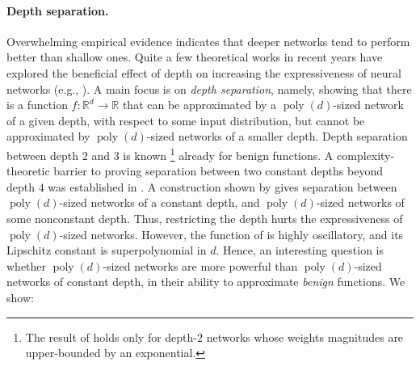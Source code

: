 \documentclass[11pt]{article}
\newcommand{\reals}{{\mathbb R}}
\DeclareMathOperator{\poly}{poly}
\begin{document}
\paragraph{Depth separation.}
Overwhelming empirical evidence indicates that deeper networks tend to perform better than shallow ones.
Quite a few theoretical works in recent years have explored the beneficial effect of depth on increasing the expressiveness of neural networks
(e.g., \cite{martens2013representational,eldan2016power,telgarsky2016benefits,liang2016deep,daniely2017depth,safran2017depth,yarotsky2017error,safran2019depth,vardi2020neural,bresler2020sharp}).
A main focus is on {\em depth separation}, namely, showing that there is a function $f:\reals^d \rightarrow \reals$ that can be approximated by a $\poly(d)$-sized network of a given depth, with respect to some input distribution, but cannot be approximated by $\poly(d)$-sized networks of a smaller depth.
%
Depth separation between depth $2$ and $3$ is known \citep{eldan2016power,daniely2017depth}\footnote{The result of \cite{daniely2017depth} holds only for depth-$2$ networks whose weights magnitudes are upper-bounded by an exponential.} already for benign functions.
A complexity-theoretic barrier to proving separation between two constant depths beyond depth $4$ was established in \cite{vardi2020neural}. 
A construction shown by \cite{telgarsky2016benefits} gives separation between $\poly(d)$-sized networks of a constant depth, and $\poly(d)$-sized networks of some nonconstant depth. Thus, restricting the depth hurts the expressiveness of $\poly(d)$-sized networks. However, the function of \cite{telgarsky2016benefits} is highly oscillatory, and its Lipschitz constant is %
superpolynomial in $d$.
Hence, an interesting question is whether 
$\poly(d)$-sized networks 
are
more powerful than $\poly(d)$-sized networks of constant depth, in their ability to approximate \emph{benign} functions.
We show:
\end{document}

